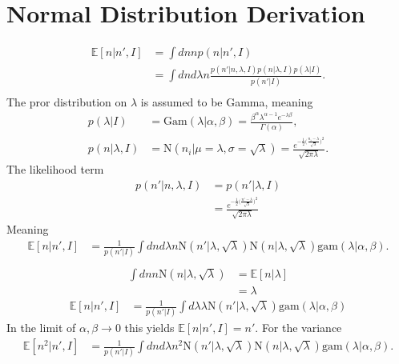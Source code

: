 \section{Normal Distribution Derivation}
\begin{equation}
	\begin{split}
		\mathbb{E}[n|n',I] &= \int dn np(n|n',I)\\
		& = \int dnd\lambda n  \frac{p(n'|n,\lambda,I)p(n|\lambda,I)p(\lambda|I)}{p(n'|I)}.\\
	\end{split}
\end{equation}
The pror distribution on $\lambda$ is assumed to be Gamma, meaning
\begin{equation}
	\begin{split}
		p(\lambda|I) &= \text{Gam}(\lambda|\alpha,\beta)=\frac{\beta^\alpha\lambda^{\alpha-1}e^{-\lambda \beta}}{\Gamma(\alpha)},\\
		p(n|\lambda,I) &= \text{N}(n_i|\mu = \lambda,\sigma = \sqrt{\lambda})= \frac{e^{-\frac{1}{2}\big(\frac{n_i-\lambda}{\sqrt{\lambda}}\big)^2}}{\sqrt{2\pi\lambda}}.
	\end{split}
\end{equation}
The likelihood term
\begin{equation}
	\begin{split}
		p(n'|n,\lambda,I) & = p(n'|\lambda,I)\\
		& =\frac{e^{-\frac{1}{2}\big(\frac{n'-\lambda}{\sqrt{\lambda}}\big)^2}}{\sqrt{2\pi\lambda}}
	\end{split}
\end{equation}
Meaning
\begin{equation}
	\begin{split}
		\mathbb{E}[n|n',I] & = \frac{1}{p(n'|I)}\int dnd\lambda n  \text{N}(n'| \lambda,\sqrt{\lambda})\text{N}(n|\lambda, \sqrt{\lambda})\text{gam}(\lambda|\alpha,\beta).\\
	\end{split}
\end{equation}
\begin{equation}
	\begin{split}
		\int dn n \text{N}(n|\lambda, \sqrt{\lambda})  & =\mathbb{E}[n|\lambda]\\
		& = \lambda
	\end{split}
\end{equation}
\begin{equation}
	\begin{split}
		\mathbb{E}[n|n',I] & = \frac{1}{p(n'|I)}\int d\lambda  \lambda \text{N}(n'| \lambda,\sqrt{\lambda})\text{gam}(\lambda|\alpha,\beta)
	\end{split}
\end{equation}
In the limit of $\alpha,\beta \rightarrow 0$ this yields $\mathbb{E}[n|n',I] = n'$. For the variance
\begin{equation}
	\begin{split}
		\mathbb{E}[n^2|n',I] & = \frac{1}{p(n'|I)}\int dnd\lambda n^2  \text{N}(n'| \lambda,\sqrt{\lambda})\text{N}(n|\lambda, \sqrt{\lambda})\text{gam}(\lambda|\alpha,\beta).\\
	\end{split}
\end{equation}

